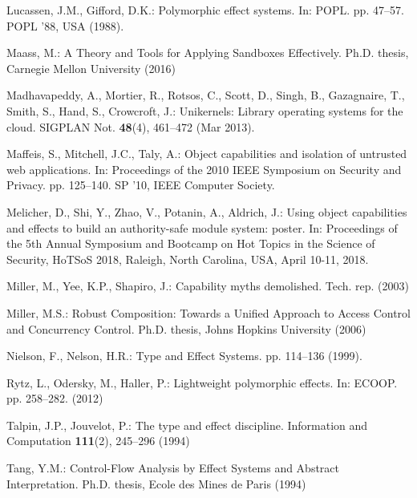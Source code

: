 \documentclass[runningheads]{llncs}
\begin{document}
\begin{thebibliography}{10}
Lucassen, J.M., Gifford, D.K.: Polymorphic effect systems. In: POPL.
  pp. 47--57. POPL '88, USA (1988).

Maass, M.: {A Theory and Tools for Applying Sandboxes Effectively}. Ph.D.
  thesis, Carnegie Mellon University (2016)

Madhavapeddy, A., Mortier, R., Rotsos, C., Scott, D., Singh, B., Gazagnaire,
  T., Smith, S., Hand, S., Crowcroft, J.: Unikernels: Library operating systems
  for the cloud. SIGPLAN Not.  \textbf{48}(4),  461--472 (Mar 2013).

Maffeis, S., Mitchell, J.C., Taly, A.: Object capabilities and isolation of
  untrusted web applications. In: Proceedings of the 2010 IEEE Symposium on
  Security and Privacy. pp. 125--140. SP '10, IEEE Computer Society.

Melicher, D., Shi, Y., Zhao, V., Potanin, A., Aldrich, J.: Using object capabilities and
effects to build an authority-safe module system: poster. In: Proceedings of the
5th Annual Symposium and Bootcamp on Hot Topics in the Science of Security,
HoTSoS 2018, Raleigh, North Carolina, USA, April 10-11, 2018.

Miller, M., Yee, K.P., Shapiro, J.: Capability myths demolished. Tech. rep.
  (2003)

Miller, M.S.: Robust Composition: Towards a Unified Approach to Access Control
  and Concurrency Control. Ph.D. thesis, Johns Hopkins University (2006)

Nielson, F., Nelson, H.R.: {Type and Effect Systems}. pp. 114--136 (1999).

Rytz, L., Odersky, M., Haller, P.: Lightweight polymorphic effects. In: ECOOP.
  pp. 258--282. (2012)

Talpin, J.P., Jouvelot, P.: The type and effect discipline. Information and
  Computation  \textbf{111}(2),  245--296 (1994)

Tang, Y.M.: Control-Flow Analysis by Effect Systems and Abstract
  Interpretation. Ph.D. thesis, Ecole des Mines de Paris (1994)

\end{thebibliography}
\end{document}
